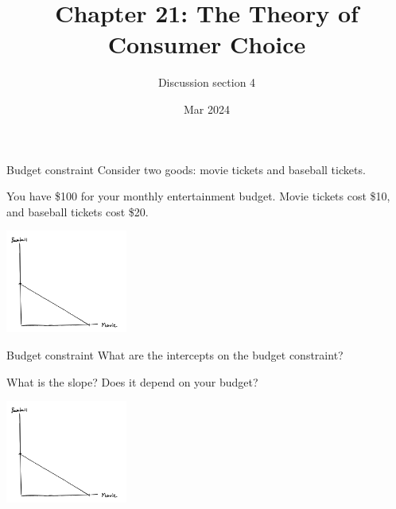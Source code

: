 \documentclass[aspectratio=169]{beamer}
\title{Chapter 21: The Theory of Consumer Choice}
\author{Discussion section 4}
\date{Mar 2024}
\begin{document}
\begin{frame}
    \titlepage 
\end{frame}







\begin{frame}{Budget constraint}
    Consider two goods: movie tickets and baseball tickets.

    You have \$100 for your monthly entertainment budget. Movie tickets cost \$10, and baseball tickets cost \$20.
    
    \centering
        \includegraphics[width = 0.3\textwidth,keepaspectratio]{BC1.png}
\end{frame}

\begin{frame}{Budget constraint}
    What are the intercepts on the budget constraint?

    \vspace{2mm}

    What is the slope? Does it depend on your budget?

    \centering
        \includegraphics[width = 0.3\textwidth,keepaspectratio]{BC1.png}
\end{frame}
\end{document}
